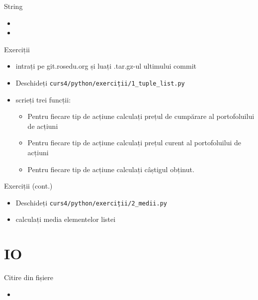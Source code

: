 \documentclass{beamer}
\begin{document}
\begin{frame}{String}
  \begin{itemize}
  \item 
  \item 
  \end{itemize}
\end{frame}

\begin{frame}{Exerciții}
  \begin{itemize}
  \item intrați pe git.rosedu.org și luați .tar.gz-ul ultimului commit
  \item Deschideți \texttt{curs4/python/exerciții/1_tuple_list.py}
  \item scrieți trei funcții:
    \begin {itemize}
    \item Pentru fiecare tip de acțiune calculați prețul de cumpărare al portofoluilui de acțiuni
    \item Pentru fiecare tip de acțiune calculați prețul curent al portofoluilui de acțiuni
    \item Pentru fiecare tip de acțiune calculați câștigul obținut.
    \end{itemize}
  \end{itemize}
\end{frame}

\begin{frame}{Exerciții (cont.)}
  \begin{itemize}
  \item Deschideți \texttt{curs4/python/exerciții/2_medii.py}
  \item calculați media elementelor listei
  \end{itemize}
\end{frame}


\section{IO}
\frame{\tableofcontents[currentsection]}

\begin{frame}{Citire din fișiere}
  \begin{itemize}
  \item \small 
  \end{itemize}
\end{frame}
\end{document}
